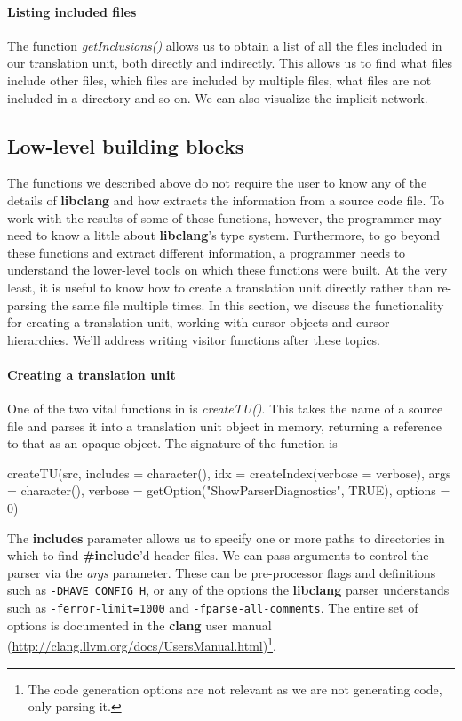 \documentclass[article]{jss}
\def\R{\proglang{R}}
\def\Rpkg#1{\pkg{#1}}
\def\Rfunc#1{\textsl{#1()}}
\def\Rvar#1{\textsl{#1}}
\def\Rarg#1{\textbf{#1}}
\def\Ckeyword#1{\textbf{#1}}
\def\libclang{\textbf{libclang}}
\def\clang{\textbf{clang}}
\def\libclangFlag#1{-\nolinebreak\texttt{#1}}
\begin{document}
\paragraph{Listing included files}
The function \Rfunc{getInclusions} allows us to obtain a list of all
the files included in our translation unit, both directly and
indirectly.  This allows us to find what files include other files,
which files are included by multiple files, what files are not included in a
directory and so on. We can also visualize the implicit network.




\subsection{Low-level building blocks}\label{sec:BuildingBlocks}

The functions we described above do not require the user to know any
of the details of \libclang{} and how \Rpkg{RCIndex} extracts the
information from a source code file.  To work with the results of some
of these functions, however, the \R{} programmer may need to know a
little about \libclang's type system. Furthermore, to go beyond these
functions and extract different information, a programmer needs to
understand the lower-level tools on which these functions were built.
At the very least, it is useful to know how to create a translation
unit directly rather than re-parsing the same file multiple times.  In
this section, we discuss the functionality for creating a translation
unit, working with cursor objects and cursor hierarchies.  We'll
address writing visitor functions after these topics.



\paragraph{Creating a translation unit} 
One of the two vital functions in \Rpkg{RCIndex} is \Rfunc{createTU}.
This takes the name of a source file and parses it into a translation
unit object in memory, returning a reference to that as an opaque \R{}
object.
The signature of the function is 
\begin{RCode}
createTU(src, includes = character(), 
         idx = createIndex(verbose = verbose), 
         args = character(), 
         verbose = getOption("ShowParserDiagnostics", TRUE), options = 0)   
\end{RCode}
The \Rarg{includes} parameter allows us to specify one or more paths
to directories in which to find \Ckeyword{\#include}'d header files. We
can pass arguments to control the parser via the \Rvar{args}
parameter. These can be pre-processor flags and definitions such as
\verb+-DHAVE_CONFIG_H+, or any of the options the \libclang{} parser
understands such as \texttt{-ferror-limit=1000} %
and
\mbox{\texttt{-fparse-all-comments}}. %
The entire set of options is documented in
the \clang{} user manual
(\url{http://clang.llvm.org/docs/UsersManual.html})\footnote{The code
  generation options are not relevant as we are not generating code,
  only parsing it.}.
\end{document}
